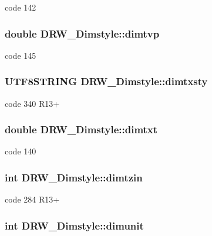 code 142 \hypertarget{classDRW__Dimstyle_a002065c5911ff94712dd7d688b886883}{
\subsubsection[{dimtvp}]{\setlength{\rightskip}{0pt plus 5cm}double D\-R\-W\-\_\-\-Dimstyle\-::dimtvp}}\label{classDRW__Dimstyle_a002065c5911ff94712dd7d688b886883}
code 145 \hypertarget{classDRW__Dimstyle_a864803fca4c604cf16d073a8a5bed0c2}{
\subsubsection[{dimtxsty}]{\setlength{\rightskip}{0pt plus 5cm}U\-T\-F8\-S\-T\-R\-I\-N\-G D\-R\-W\-\_\-\-Dimstyle\-::dimtxsty}}\label{classDRW__Dimstyle_a864803fca4c604cf16d073a8a5bed0c2}
code 340 R13+ \hypertarget{classDRW__Dimstyle_a8cc804b4094615949f6b314375d2e726}{
\subsubsection[{dimtxt}]{\setlength{\rightskip}{0pt plus 5cm}double D\-R\-W\-\_\-\-Dimstyle\-::dimtxt}}\label{classDRW__Dimstyle_a8cc804b4094615949f6b314375d2e726}
code 140 \hypertarget{classDRW__Dimstyle_a1c84c1ead844589af50adf72ab59d7dc}{
\subsubsection[{dimtzin}]{\setlength{\rightskip}{0pt plus 5cm}int D\-R\-W\-\_\-\-Dimstyle\-::dimtzin}}\label{classDRW__Dimstyle_a1c84c1ead844589af50adf72ab59d7dc}
code 284 R13+ \hypertarget{classDRW__Dimstyle_a6772e7086bdfff0c3c73892eb9068f90}{
\subsubsection[{dimunit}]{\setlength{\rightskip}{0pt plus 5cm}int D\-R\-W\-\_\-\-Dimstyle\-::dimunit}}\label{classDRW__Dimstyle_a6772e7086bdfff0c3c73892eb9068f90}
